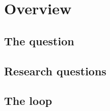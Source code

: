 \chapter{Overview}\label{ch:overview}

\section{The question}

\section{Research questions}

\section{The loop}
